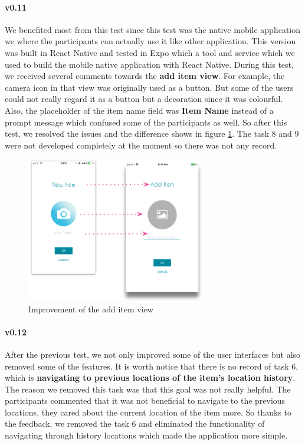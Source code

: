 \documentclass[12pt,a4paper]{article}
\begin{document}
          \paragraph{v0.11} We benefited most from this test since this test was the native mobile application we where the participants can actually use it like other application. This version was built in React Native and tested in Expo which a tool and service which we used to build the mobile native application with React Native. During this test, we received several comments towards the {\bf add item view}. For example, the camera icon in that view was originally used as a button. But some of the users could not really regard it as a button but a decoration since it was colourful. Also, the placeholder of the item name field was {\bf Item Name} instead of a prompt message which confused some of the participants as well. So after this test, we resolved the issues and the difference shows in figure \ref{fig:usability-test-ios-v010-improvements}. The task 8 and 9 were not developed completely at the moment so there was not any record.

          \begin{figure}[H]
            \centering
            \includegraphics[width=0.7\textwidth]{../assets/usability-test-ios-v010-improvements.png}
            \caption{Improvement of the add item view}
            \label{fig:usability-test-ios-v010-improvements}
          \end{figure}

          \paragraph{v0.12} After the previous test, we not only improved some of the user interfaces but also removed some of the features. It is worth notice that there is no record of task 6, which is {\bf navigating to previous locations of the item's location history}. The reason we removed this task was that this goal was not really helpful. The participants commented that it was not beneficial to navigate to the previous locations, they cared about the current location of the item more. So thanks to the feedback, we removed the task 6 and eliminated the functionality of navigating through history locations which made the application more simple. 
        
\end{document}
